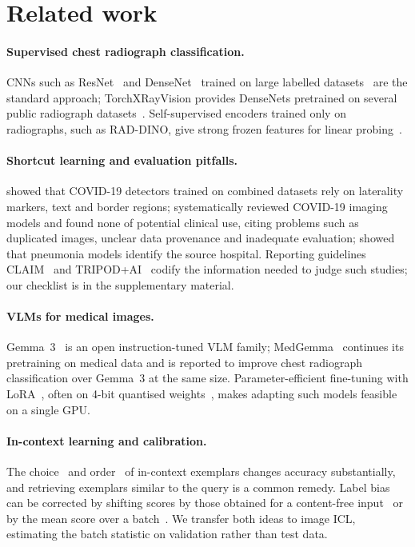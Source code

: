 \documentclass[11pt]{article}
\begin{document}
\section{Related work}

\paragraph{Supervised chest radiograph classification.} CNNs such as
ResNet~\citep{he2016resnet} and DenseNet~\citep{huang2017densenet} trained on large labelled
datasets~\citep{irvin2019chexpert} are the standard approach; TorchXRayVision provides
DenseNets pretrained on several public radiograph datasets~\citep{cohen2022torchxrayvision}.
Self-supervised encoders trained only on radiographs, such as RAD-DINO, give strong frozen
features for linear probing~\citep{perezgarcia2025raddino}.

\paragraph{Shortcut learning and evaluation pitfalls.} \citet{degrave2021shortcuts} showed that
COVID-19 detectors trained on combined datasets rely on laterality markers, text and border
regions; \citet{roberts2021pitfalls} systematically reviewed COVID-19 imaging models and found none of
potential clinical use, citing problems such as duplicated images, unclear data provenance and
inadequate evaluation;
\citet{zech2018variable} showed that pneumonia models identify the source hospital. Reporting
guidelines CLAIM~\citep{mongan2020claim,tejani2024claim} and TRIPOD+AI~\citep{collins2024tripodai}
codify the information needed to judge such studies; our checklist is in the supplementary
material.

\paragraph{VLMs for medical images.} Gemma~3~\citep{gemma2025gemma3} is an open
instruction-tuned VLM family; MedGemma~\citep{sellergren2025medgemma} continues its
pretraining on medical data and is reported to improve chest radiograph classification over
Gemma~3 at the same size. Parameter-efficient fine-tuning with LoRA~\citep{hu2022lora}, often on
4-bit quantised weights~\citep{dettmers2023qlora}, makes adapting such models feasible on a
single GPU.

\paragraph{In-context learning and calibration.} The choice~\citep{liu2022makes} and
order~\citep{lu2022fantastically} of in-context exemplars changes accuracy substantially, and
retrieving exemplars similar to the query is a common remedy. Label bias can be corrected by
shifting scores by those obtained for a content-free input~\citep{zhao2021calibrate} or by the
mean score over a batch~\citep{zhou2024batch}. We transfer both ideas to image ICL, estimating the
batch statistic on validation rather than test data.
\end{document}
